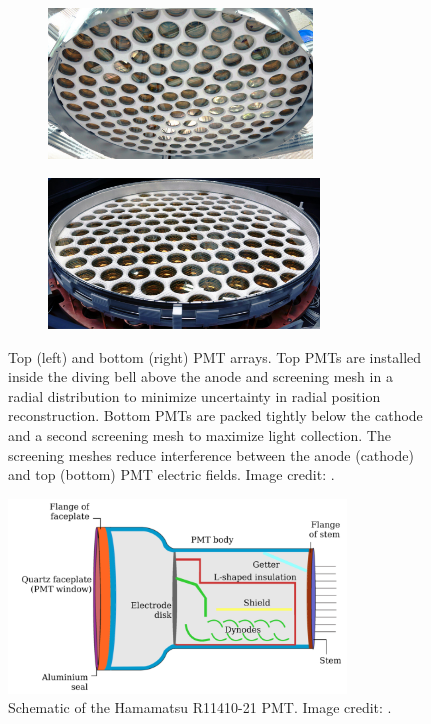 \begin{figure}
    \centering
    \begin{subfigure}[t]{0.5\textwidth}
        \centering
        \includegraphics[height=4cm]{PMTTopArray}
    \end{subfigure}%
    \begin{subfigure}[t]{0.5\textwidth}
        \centering
        \includegraphics[height=4cm]{PMTBottomArray}
    \end{subfigure}
    \caption{Top (left) and bottom (right) PMT arrays.  Top PMTs are installed inside the diving bell above the anode and screening
    mesh in a radial distribution
    to minimize uncertainty in radial position reconstruction.  Bottom PMTs are packed tightly below the cathode and a second screening
    mesh
    to maximize light collection.  The screening meshes reduce interference between the anode (cathode) and top (bottom) PMT electric
    fields.  Image credit: .}
	\label{fig:xenon1t_pmt_array}
\end{figure}

\begin{figure}
\centering
\includegraphics[width=0.8\textwidth]{PMTSchematic}
\caption{Schematic of the Hamamatsu R11410-21 PMT.  Image credit: .}
\label{fig:xenon1t_hamamatsu_pmt}
\end{figure}

